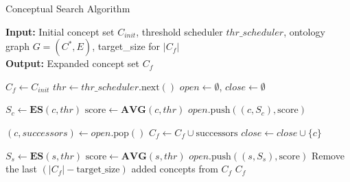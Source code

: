 \begin{algorithm}[h]
\caption{Conceptual Search Algorithm}
\label{alg:conceptual_search}
\textbf{Input:} Initial concept set \( C_{init} \), threshold scheduler \( thr\_scheduler \), ontology graph \( G = (C^*, E) \), target\_size for \( |C_f| \) \\
\textbf{Output:} Expanded concept set \( C_f \)

\begin{algorithmic}[1]
\State \( C_f \gets C_{init} \)
    \State \( thr \gets thr\_scheduler.\text{next}() \) 
    \State \( open \gets \emptyset \), \( close \gets \emptyset \) 
    
        \State \( S_c \gets \mathbf{ES}(c, thr) \)
        \State \( \text{score} \gets \mathbf{AVG}(c, thr) \)
        \State \( open.\text{push}((c, S_c), \text{score}) \)
    \EndFor
    
        \State \( (c, successors) \gets open.\text{pop}() \) 
        \State \( C_f \gets C_f \cup \text{successors} \)
        \State \( close \gets close \cup \{c\} \)

                \State \( S_s \gets \mathbf{ES}(s, thr) \)
                \State \( \text{score} \gets \mathbf{AVG}(s, thr) \)
                \State \( open.\text{push}((s, S_s), \text{score}) \)
            \EndIf
        \EndFor
    \EndWhile
\EndWhile
{}
    \State Remove the last $(|C_f| - \text{target\_size})$ added concepts from $C_f$
\EndIf
\State \Return \( C_f \)
\end{algorithmic}
\end{algorithm}
